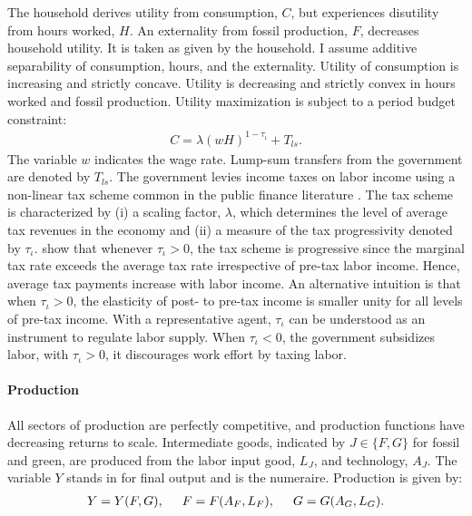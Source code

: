The household derives utility from consumption, $C$, but experiences disutility from hours worked, $H$. An externality from fossil production, $F$, decreases household utility. It is taken as given by the household.
I assume additive separability of consumption, hours, and the externality. Utility of consumption is increasing and strictly concave. Utility is decreasing and strictly convex in hours worked and fossil production.
Utility maximization is subject to a period budget constraint:
\begin{align}
	 C= \lambda(wH)^{1-\tau_{\iota}}+T_{ls}. \label{eq:hhbudget}
\end{align}
The variable $w$ indicates the wage rate.  Lump-sum transfers from the government are denoted by $T_{ls}$.
The government levies income taxes on labor income using a non-linear tax scheme common in the public finance literature \citep{Heathcote2017OptimalFramework, Benabou2002TaxEfficiency}. The tax scheme is
characterized by (i) a scaling factor, $\lambda$, which determines the level of average tax revenues in the economy and (ii) a measure of the tax progressivity denoted by $\tau_{\iota}$. 
\cite{Heathcote2017OptimalFramework} show that whenever $\tau_{\iota}>0$, the tax scheme is progressive since the marginal tax rate exceeds the average tax rate irrespective of  pre-tax labor income. Hence, average tax payments increase with labor income. An alternative intuition is that when $\tau_{\iota}>0$, the elasticity of post- to pre-tax  income is smaller unity for all levels of pre-tax income.   %
With a representative agent, $\tau_{\iota}$ can be understood as an instrument to regulate labor supply. When $\tau_{\iota}<0$, the government subsidizes labor, with $\tau_{\iota}>0$, it discourages work effort by taxing labor. 

\paragraph{Production}
All sectors of production are perfectly competitive, and production functions have decreasing returns to scale. %
Intermediate goods, indicated by $J\in \{F,G\}$ for fossil and green, are produced from the labor input good, $L_J$, and technology, $A_J$. The variable $Y$ stands in for final output and is the numeraire. Production is given by:
\begin{align}
Y=Y(F, G), \hspace{5mm} F=F(A_F, L_F),\hspace{5mm} G=G(A_G, L_G). \label{eq:prod}
\end{align}

